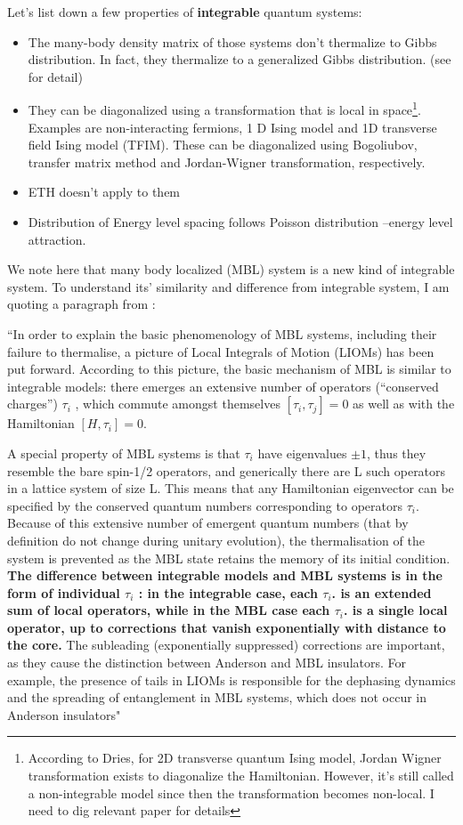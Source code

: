 \documentclass[11pt,a4paper]{article}
\begin{document}
Let's list down a few properties of \textbf{integrable} quantum systems: 
\begin{itemize}
\item The many-body density matrix of those systems don't thermalize to Gibbs distribution. In fact, they thermalize to a generalized Gibbs distribution. (see \cite{rigol2007relaxation,cassidy2011generalized} for detail) 
\item They can be diagonalized using a transformation that is local in space\footnote{According to Dries, for 2D transverse quantum Ising model, Jordan Wigner transformation exists to diagonalize the Hamiltonian. However, it's still called a non-integrable model since then the transformation becomes non-local. I need to dig relevant paper for details}. Examples are non-interacting fermions, 1 D Ising model and 1D transverse field Ising model (TFIM).  These can be diagonalized using Bogoliubov, transfer matrix method and Jordan-Wigner transformation, respectively.
\item ETH doesn't apply to them 
\item Distribution of Energy level spacing follows Poisson distribution --energy level attraction.
\end{itemize}

We note here that many body localized (MBL) system is a new kind of integrable system. To understand its' similarity and difference from integrable system, I am quoting a paragraph from \cite{o2016explicit} : 

``In order to explain the basic phenomenology of MBL systems, including their failure to thermalise, a picture of Local Integrals of Motion (LIOMs) has been put forward. According to this picture, the basic mechanism of MBL is similar to integrable models: there emerges an extensive number of operators (“conserved charges”) $\tau_i$ , which commute amongst  themselves $[\tau_i , \tau_j ]=0$ as well as with the Hamiltonian $[H, \tau_i]=0$.

A special property of MBL systems is that $\tau_i$ have eigenvalues $\pm 1$, thus they resemble the bare spin-1/2 operators, and generically there are L such operators in a lattice system of size L. This means that any Hamiltonian eigenvector can be specified by the conserved quantum numbers corresponding to operators $\tau_i$. Because of this extensive number of emergent quantum numbers (that by definition do not change during unitary evolution), the thermalisation of the system is prevented as the MBL state retains the memory of its initial condition. \textbf{The difference between integrable models and MBL systems is in the form of individual $\tau_i$ : in the integrable case, each $\tau_i$. is an extended sum of local operators, while in the MBL case each $\tau_i$. is a single local operator, up to corrections that vanish exponentially with distance to the core.} The subleading (exponentially suppressed) corrections are important, as they cause the distinction between Anderson and MBL insulators. For example, the presence of tails in LIOMs is responsible for the dephasing dynamics and the spreading of entanglement in MBL systems, which does not occur in Anderson insulators"
\end{document}
